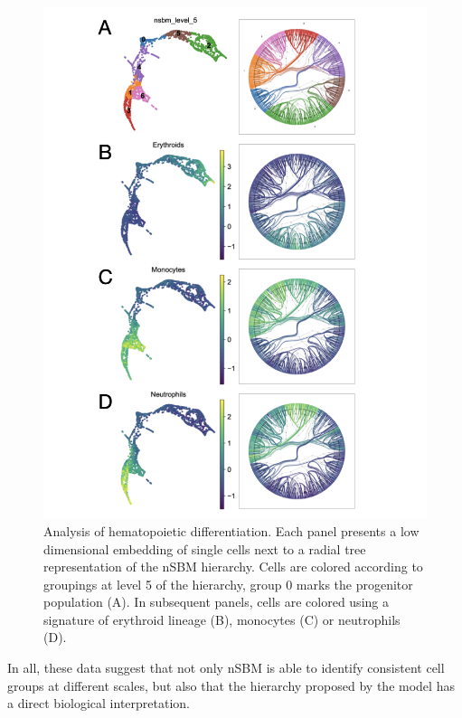 \documentclass[10pt]{article}
\begin{document}
\begin{figure}[H]
\centering
\includegraphics[keepaspectratio,width=\textwidth,height=0.55\textheight]{Figure_2.png}
\caption[]{Analysis of hematopoietic differentiation. Each panel presents a low dimensional embedding of single cells next to a radial tree representation of the nSBM hierarchy. Cells are colored according to groupings at level 5 of the hierarchy, group 0 marks the progenitor population (A). In subsequent panels, cells are colored using a signature of erythroid lineage (B), monocytes (C) or neutrophils (D).}\label{Figure2}
\end{figure}


In all, these data suggest that not only nSBM is able to identify consistent cell groups at different scales, but also that the hierarchy proposed by the model has a direct biological interpretation.


\end{document}
